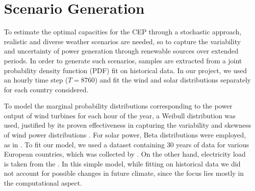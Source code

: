 \documentclass[smallextended,natbib]{svjour3}       %
\numberwithin{definition}{section}
\numberwithin{theorem}{section}
\numberwithin{proposition}{section}
\begin{document}
















\newpage
\appendix

\section{Scenario Generation}\label{generation}

To estimate the optimal capacities for the CEP through a stochastic approach, realistic and diverse weather scenarios are needed, so to capture the variability and uncertainty of power generation through renewable sources over extended periods. 
In order to generate such scenarios, samples are extracted from a joint probability density function (PDF) fit on historical data. 
In our project, we used an hourly time step ($T=8760$) and fit the wind and solar distributions separately for each country considered.

To model the marginal probability distributions corresponding to the power output of wind turbines for each hour of the year, a Weibull distribution was used, justified by its proven effectiveness in capturing the variability and skewness of wind power distributions \citep{weibullwind}. 
For solar power, Beta distributions were employed, as in \citet{betaPV}.
To fit our model, we used a dataset containing 30 years of data for various European countries, which was collected by \citet{30y_gen}. 
On the other hand, electricity load is taken from the \citet{ENTSOE_PowerStats}.
In this simple model, while fitting on historical data we did not account for possible changes in future climate, since the focus lies mostly in the computational aspect.
\end{document}
